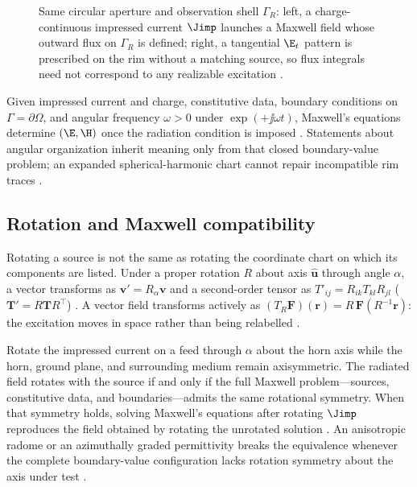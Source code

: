 \begin{figure}[t]
\centering
\VolIPhysFig{\VolIPhysMatchedAperture}
\caption{Same circular aperture and observation shell $\Gamma_R$: left, a charge-continuous impressed current $\Jimp$ launches a Maxwell field whose outward flux on $\Gamma_R$ is defined; right, a tangential $\E_t$ pattern is prescribed on the rim without a matching source, so flux integrals need not correspond to any realizable excitation \cite{stratton1941,harrington2001}.}
\label{fig:ch1.wp-matched-aperture}
\end{figure}

Given impressed current and charge, constitutive data, boundary conditions on
$\Gamma=\partial\Omega$, and angular frequency $\omega>0$ under $\exp(+\jj\omega t)$,
Maxwell's equations determine $(\E,\H)$ once the radiation condition is imposed
\cite{maxwell1873,stratton1941}. Statements about angular organization inherit meaning only
from that closed boundary-value problem; an expanded spherical-harmonic chart cannot repair
incompatible rim traces \cite{stratton1941,harrington2001}.
\subsection{Rotation and Maxwell compatibility}
\label{sec:ch01.0.2}

Rotating a source is not the same as rotating the coordinate chart on which its components are listed. Under a proper rotation $R$ about axis $\hat{\mathbf{u}}$ through angle $\alpha$, a vector transforms as $\mathbf{v}'=R_\alpha\mathbf{v}$ and a second-order tensor as $T'_{ij}=R_{ik}T_{kl}R_{jl}$ ($\mathbf{T}'=R\mathbf{T}R^\top$) \cite{stratton1941}. A vector field transforms actively as $(T_R\mathbf{F})(\mathbf{r})=R\,\mathbf{F}(R^{-1}\mathbf{r})$: the excitation moves in space rather than being relabelled \cite{hansen1988}.

Rotate the impressed current on a feed through $\alpha$ about the horn axis while the
horn, ground plane, and surrounding medium remain axisymmetric. The radiated field rotates
with the source if and only if the full Maxwell problem---sources, constitutive data, and
boundaries---admits the same rotational symmetry. When that symmetry holds, solving
Maxwell's equations after rotating $\Jimp$ reproduces the field obtained by rotating the
unrotated solution \cite{stratton1941,hansen1988}. An anisotropic radome or an
azimuthally graded permittivity breaks the equivalence whenever the complete
boundary-value configuration lacks rotation symmetry about the axis under test
\cite{stratton1941}.

